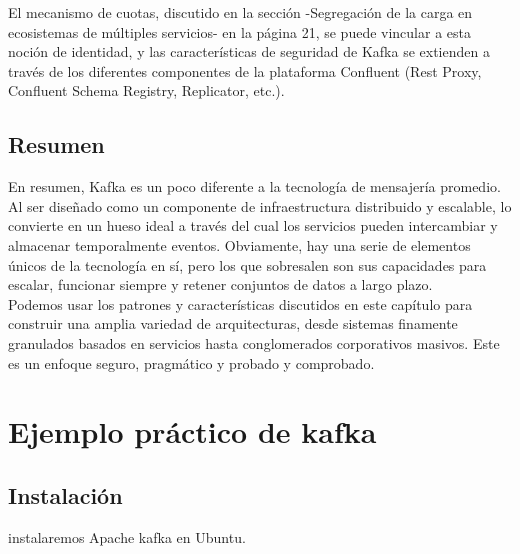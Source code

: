 \documentclass{article}
\begin{document}
El mecanismo de cuotas, discutido en la sección -Segregación de la carga en ecosistemas de múltiples servicios- en la página 21, se puede vincular a esta noción de identidad, y las características de seguridad de Kafka se extienden a través de los diferentes componentes de la plataforma Confluent (Rest Proxy, Confluent Schema Registry, Replicator, etc.).

\subsection{Resumen}
En resumen, Kafka es un poco diferente a la tecnología de mensajería promedio. Al ser diseñado como un componente de infraestructura distribuido y escalable, lo convierte en un hueso ideal a través del cual los servicios pueden intercambiar y almacenar temporalmente eventos. Obviamente, hay una serie de elementos únicos de la tecnología en sí, pero los que sobresalen son sus capacidades para escalar, funcionar siempre y retener conjuntos de datos a largo plazo.\\

Podemos usar los patrones y características discutidos en este capítulo para construir una amplia variedad de arquitecturas, desde sistemas finamente granulados basados en servicios hasta conglomerados corporativos masivos. Este es un enfoque seguro, pragmático y probado y comprobado.

\newpage
\section{Ejemplo práctico de kafka}
\subsection{Instalación}
instalaremos Apache kafka en Ubuntu.
\end{document}
